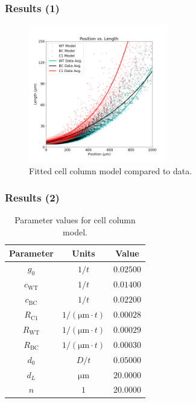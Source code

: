 \documentclass{beamer}
\newcommand{\um}{\unit{\micro\metre}}
\begin{document}
\begin{frame}
    \frametitle{Results (1)}
    \begin{figure}
        \centering
        \includegraphics[height=6cm]{column-position-length.png}
        \caption{Fitted cell column model compared to data.}
    \end{figure}
\end{frame}

\begin{frame}
\frametitle{Results (2)}
\begin{table}
\begin{center}
    \begin{tabular}{ |c|c|c| }
    \hline
     Parameter & Units & Value \\
     \hline
     $g_{0}$ & $1/t$ & $0.02500$ \\ 
     $c_{\text{WT}}$ & $1/t$ & $0.01400$ \\ 
     $c_{\text{BC}}$ & $1/t$ & $0.02200$ \\ 
     $R_{\text{C1}}$ & $1/(\um \cdot t)$ & $0.00028$ \\ 
     $R_{\text{WT}}$ & $1/(\um \cdot t)$ & $0.00029$ \\ 
     $R_{\text{BC}}$ & $1/(\um \cdot t)$ & $0.00030$ \\ 
     $d_{0}$ & $D/t$ & $0.05000$ \\ 
     $d_{L}$ & $\um$ & $20.0000$ \\ 
     $n$ & $1$ & $20.0000$ \\ 
     \hline
    \end{tabular}
\caption{Parameter values for cell column model.}
\end{center}
\end{table}


\end{frame}
\end{document}
